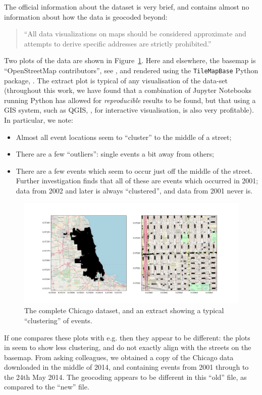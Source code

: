 \documentclass[twoside,a4paper,twocolumn,10pt]{article}
\theoremstyle{plain}
\theoremstyle{definition}
\begin{document}
The official information about the dataset is very brief, and contains almost no information about
how the data is geocoded beyond:
\begin{quote}
``All data visualizations on maps should be considered approximate and
attempts to derive specific addresses are strictly prohibited.''
\end{quote}
Two plots of the data are shown in Figure~\ref{fig:one}.  Here and elsewhere, the basemap is
``\textcopyright OpenStreetMap contributors'', see \cite{osm}, and rendered using the
\texttt{TileMapBase} Python package, \cite{tmb}.  The extract plot is typical of any visualisation
of the data-set (throughout this work, we have found that a combination of Jupyter Notebooks running
Python has allowed for \emph{reproducible} results to be found, but that using a GIS system,
such as QGIS, \cite{qgis}, for interactive visualisation, is also very profitable).  In particular,
we note:
\begin{itemize}
\item Almost all event locations seem to ``cluster'' to the middle of a street;
\item There are a few ``outliers'': single events a bit away from others;
\item There are a few events which seem to occur just off the middle of the street.  Further
  investigation finds that all of these are events which occurred in 2001; data from 2002 and
  later is always ``clustered'', and data from 2001 never is.
\end{itemize}

\begin{figure}
  \includegraphics[width=\textwidth]{Chicago_overview.png}
  \caption{The complete Chicago dataset, and an extract showing a typical ``clustering'' of events.}
  \label{fig:one}
\end{figure}

If one compares these plots with e.g. \cite[Page~3]{rosser_sepp} then they appear to be
different: the plots in \cite{rosser_sepp} seem to show less clustering, and do not exactly
align with the streets on the basemap.  From asking colleagues, we obtained a copy of the
Chicago data downloaded in the middle of 2014, and containing events from 2001 through to
the 24th May 2014.  The geocoding appears to be different in this ``old'' file,
as compared to the ``new'' file.
\end{document}
